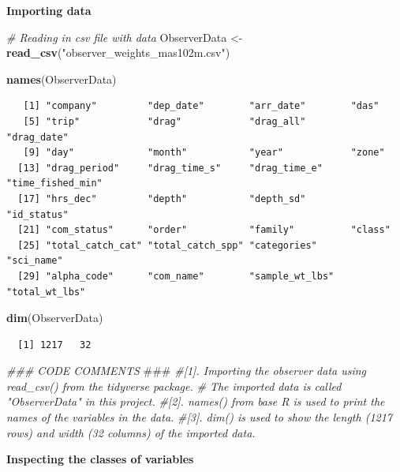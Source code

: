 \documentclass[
]{book}
\newenvironment{Shaded}{\begin{snugshade}}{\end{snugshade}}
\newcommand{\AlertTok}[1]{\textcolor[rgb]{0.94,0.16,0.16}{#1}}
\newcommand{\CommentTok}[1]{\textcolor[rgb]{0.56,0.35,0.01}{\textit{#1}}}
\newcommand{\KeywordTok}[1]{\textcolor[rgb]{0.13,0.29,0.53}{\textbf{#1}}}
\newcommand{\NormalTok}[1]{#1}
\newcommand{\StringTok}[1]{\textcolor[rgb]{0.31,0.60,0.02}{#1}}
\begin{document}
\textbf{Importing data}

\begin{Shaded}
\begin{Highlighting}[]
\CommentTok{# Reading in csv file with data}
\NormalTok{ObserverData <-}\StringTok{ }\KeywordTok{read_csv}\NormalTok{(}\StringTok{"observer_weights_mas102m.csv"}\NormalTok{)}

\KeywordTok{names}\NormalTok{(ObserverData)}
\end{Highlighting}
\end{Shaded}

\begin{verbatim}
   [1] "company"         "dep_date"        "arr_date"        "das"            
   [5] "trip"            "drag"            "drag_all"        "drag_date"      
   [9] "day"             "month"           "year"            "zone"           
  [13] "drag_period"     "drag_time_s"     "drag_time_e"     "time_fished_min"
  [17] "hrs_dec"         "depth"           "depth_sd"        "id_status"      
  [21] "com_status"      "order"           "family"          "class"          
  [25] "total_catch_cat" "total_catch_spp" "categories"      "sci_name"       
  [29] "alpha_code"      "com_name"        "sample_wt_lbs"   "total_wt_lbs"
\end{verbatim}

\begin{Shaded}
\begin{Highlighting}[]
\KeywordTok{dim}\NormalTok{(ObserverData)}
\end{Highlighting}
\end{Shaded}

\begin{verbatim}
  [1] 1217   32
\end{verbatim}

\begin{Shaded}
\begin{Highlighting}[]
\CommentTok{### CODE COMMENTS }\AlertTok{###}
\CommentTok{#[1]. Importing the observer data using read_csv() from the tidyverse package.}
\CommentTok{#     The imported data is called "ObserverData" in this project.}
\CommentTok{#[2]. names() from base R is used to print the names of the variables in the data. }
\CommentTok{#[3]. dim() is used to show the length (1217 rows) and width (32 columns) of the imported data. }
\end{Highlighting}
\end{Shaded}

\textbf{Inspecting the classes of variables}
\end{document}
